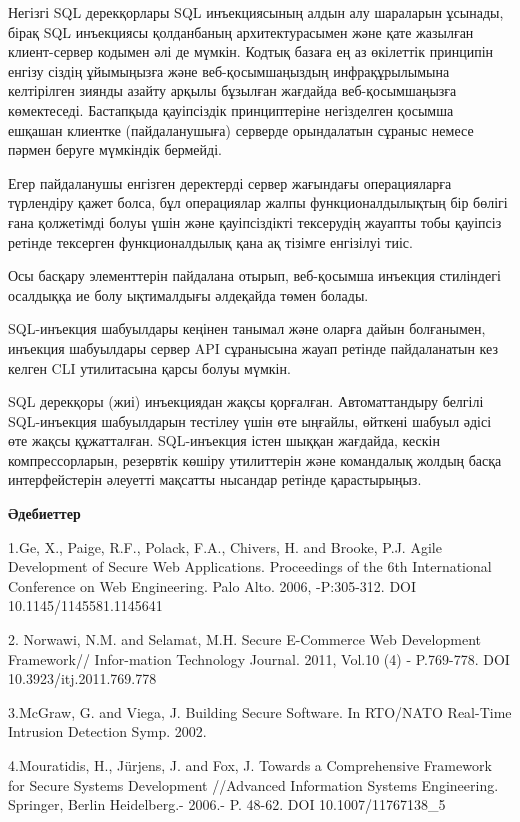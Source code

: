 Негізгі SQL дерекқорлары SQL инъекциясының алдын алу шараларын ұсынады,
бірақ SQL инъекциясы қолданбаның архитектурасымен және қате жазылған
клиент-сервер кодымен әлі де мүмкін. Кодтық базаға ең аз өкілеттік
принципін енгізу сіздің ұйымыңызға және веб-қосымшаңыздың
инфрақұрылымына келтірілген зиянды азайту арқылы бұзылған жағдайда
веб-қосымшаңызға көмектеседі. Бастапқыда қауіпсіздік принциптеріне
негізделген қосымша ешқашан клиентке (пайдаланушыға) серверде
орындалатын сұраныс немесе пәрмен беруге мүмкіндік бермейді.

Егер пайдаланушы енгізген деректерді сервер жағындағы операцияларға
түрлендіру қажет болса, бұл операциялар жалпы функционалдылықтың бір
бөлігі ғана қолжетімді болуы үшін және қауіпсіздікті тексерудің жауапты
тобы қауіпсіз ретінде тексерген функционалдылық қана ақ тізімге
енгізілуі тиіс.

Осы басқару элементтерін пайдалана отырып, веб-қосымша инъекция
стиліндегі осалдыққа ие болу ықтималдығы әлдеқайда төмен болады.

SQL-инъекция шабуылдары кеңінен танымал және оларға дайын болғанымен,
инъекция шабуылдары сервер API сұранысына жауап ретінде пайдаланатын кез
келген CLI утилитасына қарсы болуы мүмкін.

SQL дерекқоры (жиі) инъекциядан жақсы қорғалған. Автоматтандыру белгілі
SQL-инъекция шабуылдарын тестілеу үшін өте ыңғайлы, өйткені шабуыл әдісі
өте жақсы құжатталған. SQL-инъекция істен шыққан жағдайда, кескін
компрессорларын, резервтік көшіру утилиттерін және командалық жолдың
басқа интерфейстерін әлеуетті мақсатты нысандар ретінде қарастырыңыз.

{\bfseries Әдебиеттер}

1.Ge, X., Paige, R.F., Polack, F.A., Chivers, H. and Brooke, P.J. Agile
Development of Secure Web Applications. Proceedings of the 6th
International Conference on Web Engineering. Palo Alto. 2006,
-P:305-312. DOI 10.1145/1145581.1145641

2. Norwawi, N.M. and Selamat, M.H. Secure E-Commerce Web Development
Framework// Infor-mation Technology Journal. 2011, Vol.10 (4) -
P.769-778. DOI 10.3923/itj.2011.769.778

3.McGraw, G. and Viega, J. Building Secure Software. In RTO/NATO
Real-Time Intrusion Detection Symp. 2002.

4.Mouratidis, H., Jürjens, J. and Fox, J. Towards a Comprehensive
Framework for Secure Systems Development //Advanced Information Systems
Engineering. Springer, Berlin Heidelberg.- 2006.- P. 48-62. DOI
10.1007/11767138\_5

